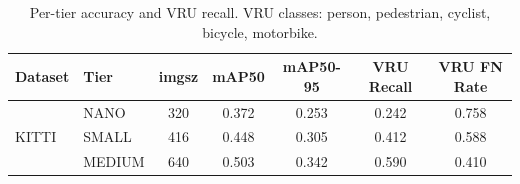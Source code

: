 \begin{table}[t]
\centering
\caption{Per-tier accuracy and VRU recall. VRU classes: person, pedestrian, cyclist, bicycle, motorbike.}
\label{tab:accuracy_per_tier}
\begin{tabular}{llccccc}
\toprule
Dataset & Tier & imgsz & mAP50 & mAP50-95 & VRU Recall & VRU FN Rate \\
\midrule
\multirow{3}{*}{KITTI} & NANO & 320 & 0.372 & 0.253 & 0.242 & 0.758 \\
 & SMALL & 416 & 0.448 & 0.305 & 0.412 & 0.588 \\
 & MEDIUM & 640 & 0.503 & 0.342 & 0.590 & 0.410 \\
\bottomrule
\end{tabular}
\end{table}